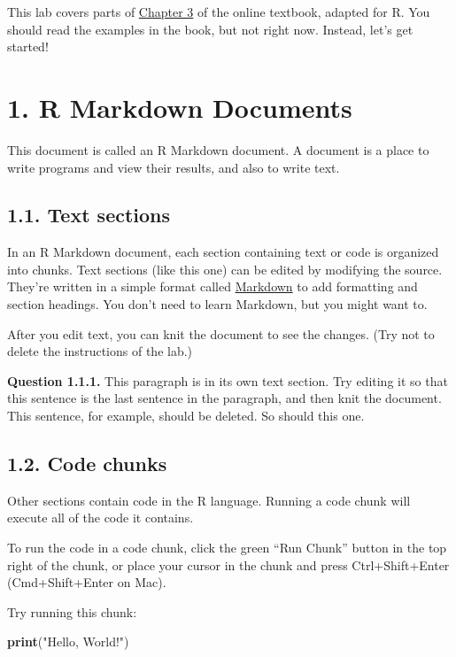\documentclass[
]{article}
\newenvironment{Shaded}{\begin{snugshade}}{\end{snugshade}}
\newcommand{\FunctionTok}[1]{\textcolor[rgb]{0.13,0.29,0.53}{\textbf{#1}}}
\newcommand{\NormalTok}[1]{#1}
\newcommand{\StringTok}[1]{\textcolor[rgb]{0.31,0.60,0.02}{#1}}
\begin{document}
This lab covers parts of
\href{http://www.inferentialthinking.com/chapters/03/programming-in-python.html}{Chapter
3} of the online textbook, adapted for R. You should read the examples
in the book, but not right now. Instead, let's get started!

\section{1. R Markdown Documents}\label{r-markdown-documents}

This document is called an R Markdown document. A document is a place to
write programs and view their results, and also to write text.

\subsection{1.1. Text sections}\label{text-sections}

In an R Markdown document, each section containing text or code is
organized into chunks. Text sections (like this one) can be edited by
modifying the source. They're written in a simple format called
\href{https://www.markdownguide.org/basic-syntax/}{Markdown} to add
formatting and section headings. You don't need to learn Markdown, but
you might want to.

After you edit text, you can knit the document to see the changes. (Try
not to delete the instructions of the lab.)

\textbf{Question 1.1.1.} This paragraph is in its own text section. Try
editing it so that this sentence is the last sentence in the paragraph,
and then knit the document. This sentence, for example, should be
deleted. So should this one.

\subsection{1.2. Code chunks}\label{code-chunks}

Other sections contain code in the R language. Running a code chunk will
execute all of the code it contains.

To run the code in a code chunk, click the green ``Run Chunk'' button in
the top right of the chunk, or place your cursor in the chunk and press
Ctrl+Shift+Enter (Cmd+Shift+Enter on Mac).

Try running this chunk:

\begin{Shaded}
\begin{Highlighting}[]
\FunctionTok{print}\NormalTok{(}\StringTok{"Hello, World!"}\NormalTok{)}
\end{Highlighting}
\end{Shaded}
\end{document}
